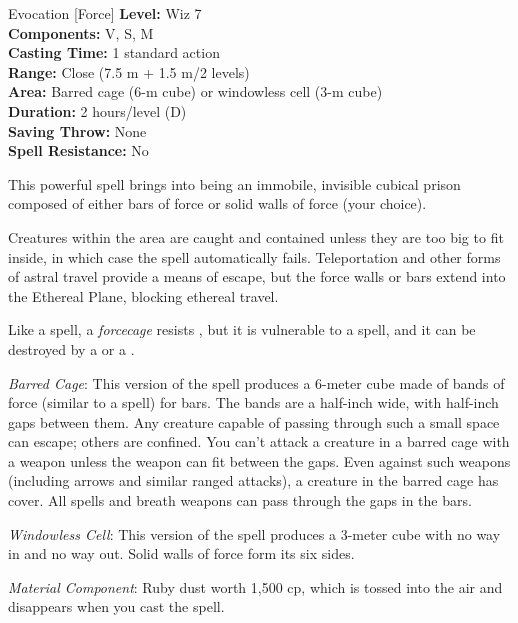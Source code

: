{Evocation [Force]}
{
	\textbf{Level:}
	Wiz 7\\
	\textbf{Components:}
	V, S, M\\
	\textbf{Casting Time:}
	1 standard action\\
	\textbf{Range:}
	Close (7.5 m + 1.5 m/2 levels)\\
	\textbf{Area:}
	Barred cage (6-m cube) or windowless cell (3-m cube)\\
	\textbf{Duration:}
	2 hours/level (D)\\
	\textbf{Saving Throw:}
	None\\
	\textbf{Spell Resistance:}
	No\\
}
{
	This powerful spell brings into being an immobile, invisible cubical prison composed of either bars of force or solid walls of force (your choice).

	Creatures within the area are caught and contained unless they are too big to fit inside, in which case the spell automatically fails. Teleportation and other forms of astral travel provide a means of escape, but the force walls or bars extend into the Ethereal Plane, blocking ethereal travel.

	Like a  spell, a \emph{forcecage} resists , but it is vulnerable to a  spell, and it can be destroyed by a  or a .

	\textit{Barred Cage}:
	This version of the spell produces a 6-meter cube made of bands of force (similar to a  spell) for bars. The bands are a half-inch wide, with half-inch gaps between them. Any creature capable of passing through such a small space can escape; others are confined. You can't attack a creature in a barred cage with a weapon unless the weapon can fit between the gaps. Even against such weapons (including arrows and similar ranged attacks), a creature in the barred cage has cover. All spells and breath weapons can pass through the gaps in the bars.

	\textit{Windowless Cell}:
	This version of the spell produces a 3-meter cube with no way in and no way out. Solid walls of force form its six sides.

	\textit{Material Component}:
	Ruby dust worth 1,500 cp, which is tossed into the air and disappears when you cast the spell.

}
